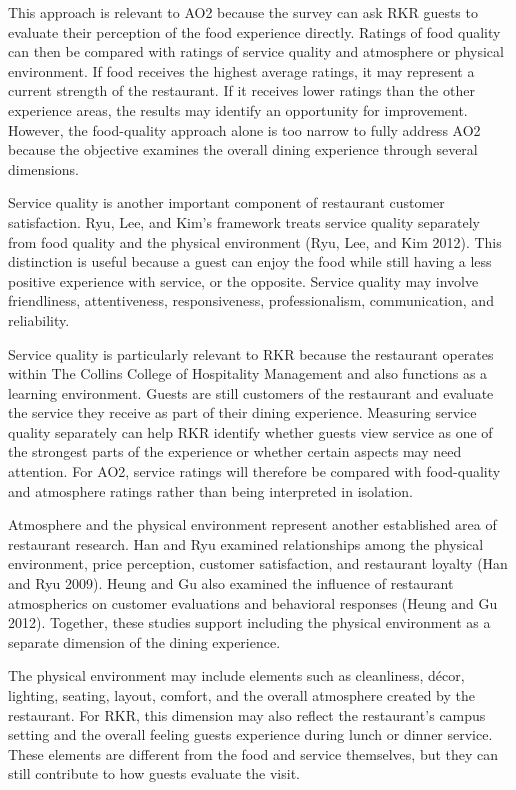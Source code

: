 \documentclass[
  12pt,
  letterpaper,
  DIV=11,
  numbers=noendperiod]{scrartcl}
\begin{document}
This approach is relevant to AO2 because the survey can ask RKR guests
to evaluate their perception of the food experience directly. Ratings of
food quality can then be compared with ratings of service quality and
atmosphere or physical environment. If food receives the highest average
ratings, it may represent a current strength of the restaurant. If it
receives lower ratings than the other experience areas, the results may
identify an opportunity for improvement. However, the food-quality
approach alone is too narrow to fully address AO2 because the objective
examines the overall dining experience through several dimensions.

Service quality is another important component of restaurant customer
satisfaction. Ryu, Lee, and Kim's framework treats service quality
separately from food quality and the physical environment (Ryu, Lee, and
Kim 2012). This distinction is useful because a guest can enjoy the food
while still having a less positive experience with service, or the
opposite. Service quality may involve friendliness, attentiveness,
responsiveness, professionalism, communication, and reliability.

Service quality is particularly relevant to RKR because the restaurant
operates within The Collins College of Hospitality Management and also
functions as a learning environment. Guests are still customers of the
restaurant and evaluate the service they receive as part of their dining
experience. Measuring service quality separately can help RKR identify
whether guests view service as one of the strongest parts of the
experience or whether certain aspects may need attention. For AO2,
service ratings will therefore be compared with food-quality and
atmosphere ratings rather than being interpreted in isolation.

Atmosphere and the physical environment represent another established
area of restaurant research. Han and Ryu examined relationships among
the physical environment, price perception, customer satisfaction, and
restaurant loyalty (Han and Ryu 2009). Heung and Gu also examined the
influence of restaurant atmospherics on customer evaluations and
behavioral responses (Heung and Gu 2012). Together, these studies
support including the physical environment as a separate dimension of
the dining experience.

The physical environment may include elements such as cleanliness,
décor, lighting, seating, layout, comfort, and the overall atmosphere
created by the restaurant. For RKR, this dimension may also reflect the
restaurant's campus setting and the overall feeling guests experience
during lunch or dinner service. These elements are different from the
food and service themselves, but they can still contribute to how guests
evaluate the visit.
\end{document}
